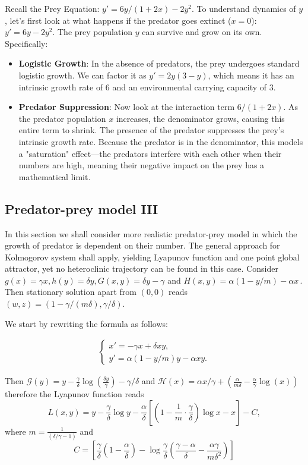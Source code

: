 \documentclass[reqno,10pt]{article}
\theoremstyle{definition}
\numberwithin{equation}{section}
\numberwithin{theorem}{section}
\begin{document}
\noindent
Recall the Prey Equation: $y'=6y/(1+2x)-2y^2$. To understand dynamics of $y$, let's first look at what happens if the predator goes extinct ($x=0$): $y'=6y-2y^2$. The prey population $y$ can survive and grow on its own. Specifically:
\begin{itemize}
\item {\bf Logistic Growth}: In the absence of predators, the prey undergoes standard logistic growth. We can factor it as 
$y'=2y(3-y)$, which means it has an intrinsic growth rate of $6$ and an environmental carrying capacity of $3$.
\item {\bf Predator Suppression}: Now look at the interaction term  $6/(1+2x)$. As the predator population $x$ increases, the denominator grows, causing this entire term to shrink. The presence of the predator suppresses the prey's intrinsic growth rate. Because the predator is in the denominator, this models a "saturation" effect—the predators interfere with each other when their numbers are high, meaning their negative impact on the prey has a mathematical limit.
\end{itemize}

\subsection{Predator-prey model III}
In this section we shall consider more realistic predator-prey model in which the growth of predator is dependent on their number. The general approach for Kolmogorov system shall apply, yielding Lyapunov function and one point global attractor, yet no heteroclinic trajectory can be found in this case. Consider  $g(x) = \gamma x, h(y) = \delta y, G(x,y)=\delta y-\gamma$ and $H(x,y) = \alpha (1-y/m) - \alpha x\,.$ Then stationary solution apart from $(0,0)$ reads $(w,z)=(1-\gamma/(m\delta),\gamma/\delta)$.

We start by rewriting the formula as follows:

    \begin{align}
        \left\{
        \begin{array}{l}
        x' = -\gamma x + \delta xy, \\
        y' = \alpha (1-y/m)y - \alpha xy.
        \end{array}
        \right.
    \end{align}

    Then ${\mathcal G}(y)=y-\frac{\gamma}{\delta}\log (\frac{\delta y}{\gamma})-\gamma/\delta$ and 
    ${\mathcal H}(x)=\alpha x/\gamma +\left(\frac{\alpha}{m\delta}
-\frac{\alpha}{\gamma} \log (x)\right)$   therefore the 
    Lyapunov function reads
    \[
    L(x,y) = y - \frac{\gamma}{\delta} \log y - \frac{\alpha}{\delta} \left[ \left(1-\frac{1}{m}\cdot \frac{\gamma}{\delta} \right) \log x - x\right]-C,\]
where $m = \frac{1}{(\delta/\gamma - 1)}$ and
\[
C=\left[\frac{\gamma}{\delta} \left(1-\frac{\alpha}{\delta}\right) - \log \frac{\gamma}{\delta}\left(\frac{\gamma-\alpha}{\delta} - \frac{\alpha \gamma}{m \delta^2}\right) \right]
\]
\end{document}
